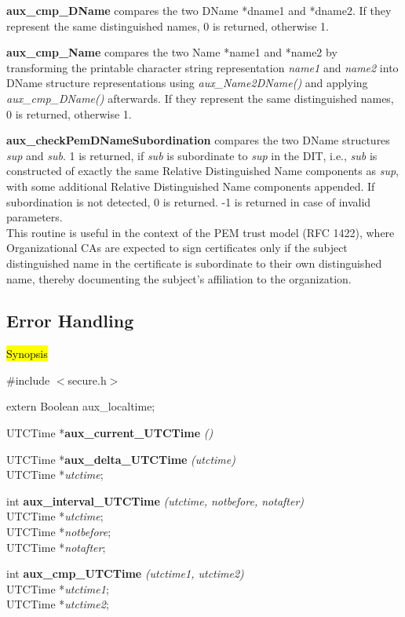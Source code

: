 {\bf aux\_cmp\_DName} compares the two DName *dname1 and *dname2.
If they represent the same distinguished names,
0 is returned, otherwise 1. 

{\bf aux\_cmp\_Name} compares the two Name *name1 and *name2 by
transforming the printable character string representation {\em name1} 
and {\em name2} into DName structure representations using
{\em aux\_Name2DName()} and applying {\em aux\_cmp\_DName()}
afterwards.
If they represent the same distinguished names,
0 is returned, otherwise 1.

{\bf aux\_checkPemDNameSubordination} compares the two DName structures {\em *sup} and {\em *sub}.
1 is returned, 
if {\em sub} is subordinate to {\em sup} in the DIT, i.e., {\em sub} is constructed of exactly the same
Relative Distinguished Name components as {\em sup}, with some additional Relative Distinguished Name
components appended.
If subordination is not detected, 0 is returned. -1 is returned in case of invalid parameters.\\
This routine is useful in the context of the PEM trust model (RFC 1422), where 
Organizational CAs are expected to sign certificates only if the subject distinguished
name in the certificate is subordinate to their own distinguished name, thereby 
documenting the subject's affiliation to the organization.

\subsection{Error Handling}
\label{aux_time}
\hl{Synopsis}

\#include $<$secure.h$>$

extern Boolean aux\_localtime;

UTCTime *{\bf aux\_current\_UTCTime} {\em ()}

UTCTime *{\bf aux\_delta\_UTCTime} {\em (utctime)} \\
UTCTime *{\em utctime}; 

int {\bf aux\_interval\_UTCTime} {\em (utctime, notbefore, notafter)} \\
UTCTime *{\em utctime}; \\ 
UTCTime *{\em notbefore}; \\ 
UTCTime *{\em notafter};

int {\bf aux\_cmp\_UTCTime} {\em (utctime1, utctime2)} \\
UTCTime *{\em utctime1}; \\
UTCTime *{\em utctime2}; 

